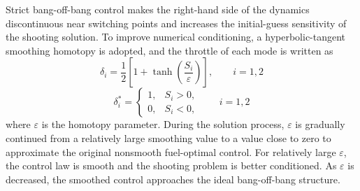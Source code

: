 ﻿\documentclass{IEEEtaes}
\begin{document}
Strict bang-off-bang control makes the right-hand side of the dynamics discontinuous near switching points and increases the initial-guess sensitivity of the shooting solution. To improve numerical conditioning, a hyperbolic-tangent smoothing homotopy is adopted, and the throttle of each mode is written as
\begin{equation}
\delta_i=\frac{1}{2}\left[1+\tanh\left(\frac{S_i}{\varepsilon}\right)\right],\qquad i=1,2
\end{equation}
\begin{equation}
\delta_i^{*}=\begin{cases}
1, & S_i>0,\\
0, & S_i<0,
\end{cases}\qquad i=1,2
\end{equation}
where $\varepsilon$ is the homotopy parameter. During the solution process, $\varepsilon$ is gradually continued from a relatively large smoothing value to a value close to zero to approximate the original nonsmooth fuel-optimal control. For relatively large $\varepsilon$, the control law is smooth and the shooting problem is better conditioned. As $\varepsilon$ is decreased, the smoothed control approaches the ideal bang-off-bang structure.
\end{document}
